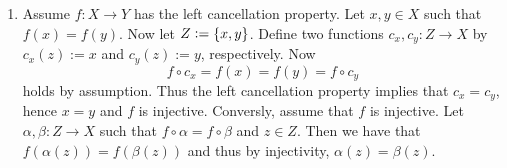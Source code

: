 \begin{enumerate}[label = \textbf{Exercise \arabic*.},wide = 0pt, itemsep=1.5ex]
		\begin{proof}
			We have that 
			\begin{equation*}
				g = g \circ \id_Y = g \circ (f \circ \wtilde{g}) = (g \circ f) \circ \wtilde{g} = \id_X \circ \wtilde{g} = \wtilde{g}.
			\end{equation*}
		\end{proof}
		Thus $g$ is invertible. 
		\begin{lemma}
			Let $\Ccat$ be a category and $f : X \to Y$, $g : Y \to Z$ isomorphisms. Then also $g \circ f$ is an isomorphism with $(g \circ f)^{-1} = f^{-1} \circ g^{-1}$.
		\end{lemma}
	\begin{proof}
		We have that 
		\begin{equation*}
			(f^{-1} \circ g^{-1}) \circ (g \circ f) = \id_X \qquad \text{and} \qquad (g \circ f) \circ (f^{-1} \circ g^{-1}) = \id_Z.
		\end{equation*}
		Hence the statement follows by the uniqueness of the inverse.
	\end{proof}
	Therefore also
	\begin{equation*}
		f = (h \circ g)^{-1} \circ (h \circ g \circ f) \qquad \text{and} \qquad h = (h \circ g \circ f) \circ (g \circ f)^{-1}
	\end{equation*}
	\noindent are isomorphisms.

	\item Assume $f : X \to Y$ has the left cancellation property. Let $x,y \in X$ such that $f(x) = f(y)$. Now let $Z := \cbr[0]{x,y}$. Define two functions $c_x,c_y : Z \to X$ by $c_x(z) := x$ and $c_y(z) := y$, respectively. Now
		\begin{equation*}
			f \circ c_x = f(x) = f(y) = f \circ c_y
		\end{equation*}
		\noindent holds by assumption. Thus the left cancellation property implies that $c_x = c_y$, hence $x = y$ and $f$ is injective. Conversly, assume that $f$ is injective. Let $\alpha,\beta : Z \to X$ such that $f \circ \alpha = f \circ \beta$ and $z \in Z$. Then we have that $f(\alpha(z)) = f(\beta(z))$ and thus by injectivity, $\alpha(z) = \beta(z)$. 
\end{enumerate}
\printbibliography

